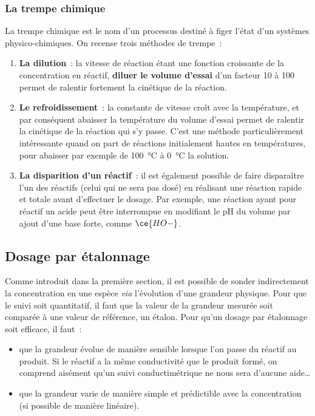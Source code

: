 \documentclass[../main/main.tex]{subfiles}
\begin{document}
\subsubsection{La trempe chimique}
La trempe chimique est le nom d'un processus destiné à figer l'état d'un
systèmes physico-chimiques. On recense trois méthodes de trempe~:
\begin{enumerate}
    \item \textbf{La dilution}~: la vitesse de réaction étant une fonction
        croissante de la concentration en réactif, \textbf{diluer le volume
        d'essai} d'un facteur 10 à 100 permet de ralentir fortement la cinétique
        de la réaction.
    \item \textbf{Le refroidissement}~: la constante de vitesse croît avec la
        température, et par conséquent abaisser la température du volume d'essai
        permet de ralentir la cinétique de la réaction qui s'y passe. C'est une
        méthode particulièrement intéressante quand on part de réactions
        initialement hautes en températures, pour abaisser par exemple de
        \SI{100}{\degreeCelsius} à \SI{0}{\degreeCelsius} la solution.
    \item \textbf{La disparition d'un réactif}~: il est également possible de
        faire disparaître l'un des réactifs (celui qui ne sera pas dosé) en
        réalisant une réaction rapide et totale avant d'effectuer le dosage. Par
        exemple, une réaction ayant pour réactif un acide peut être interrompue
        en modifiant le pH du volume par ajout d'une base forte, comme
        $\ce{HO-}$.
\end{enumerate}

\subsection{Dosage par étalonnage}
Comme introduit dans la première section, il est possible de sonder
indirectement la concentration en une espèce \textit{via} l'évolution d'une
grandeur physique. Pour que le suivi soit quantitatif, il faut que la valeur de
la grandeur mesurée soit comparée à une valeur de référence, un étalon. Pour
qu'un dosage par étalonnage soit efficace, il faut~:
\begin{itemize}
    \item que la grandeur évolue de manière sensible lorsque l'on passe du
        réactif au produit. Si le réactif a la même conductivité que le produit
        formé, on comprend aisément qu'un suivi conductimétrique ne nous sera
        d'aucune aide…
    \item que la grandeur varie de manière simple et prédictible avec la
        concentration (si possible de manière linéaire).
\end{itemize}
\end{document}
